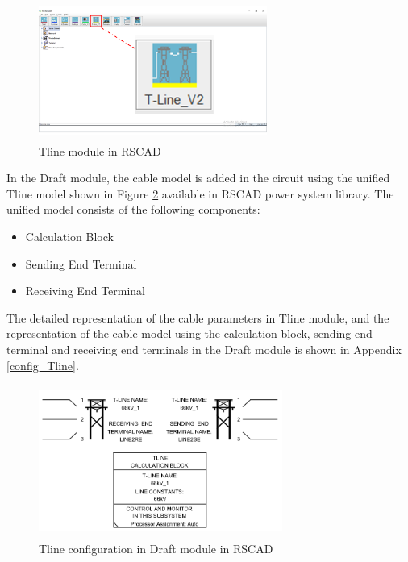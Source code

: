  \begin{figure}[H]
\centering
    \includegraphics[height = 4.5cm,width = 7.5cm]{Diagrams/Chapter_4/Tline_module_Final.png}
    \caption{Tline module in RSCAD}
    \label{fig:TlineModule_mark}
\end{figure}
 
 In the Draft module, the cable model is added in the circuit using the unified Tline model shown in Figure \ref{fig:Tline_calculationbox_RSCAD} available in RSCAD power system library. The unified model consists of the following components: 
    \begin{itemize}[noitemsep]
    \item Calculation Block
    \item Sending End Terminal
    \item Receiving End Terminal
\end{itemize}

The detailed representation of the cable parameters in Tline module, and the representation of the cable model using the calculation block, sending end terminal and receiving end terminals in the Draft module is shown in Appendix \ref{config_Tline}.

\begin{figure}[H]
  \centering
  \includegraphics[height = 5cm,width = 8cm]{Diagrams/Chapter_4/TlineParaBlock.PNG}  
  \caption{Tline configuration in Draft module in RSCAD}
  \label{fig:Tline_calculationbox_RSCAD}
\end{figure}

